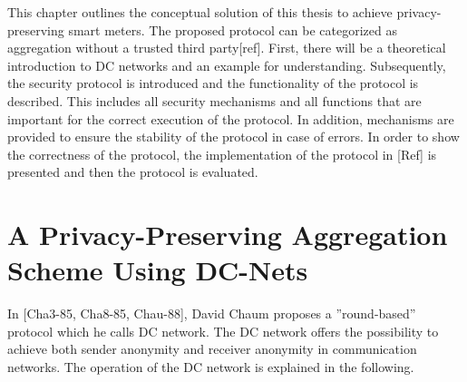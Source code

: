
This chapter outlines the conceptual solution of this thesis to achieve privacy-preserving smart meters. The proposed protocol can be categorized as aggregation without a trusted third party[ref]. First, there will be a theoretical introduction to DC networks and an example for understanding. Subsequently, the security protocol is introduced and the functionality of the protocol is described. This includes all security mechanisms and all functions that are important for the correct execution of the protocol. In addition, mechanisms are provided to ensure the stability of the protocol in case of errors. In order to show the correctness of the protocol, the implementation of the protocol in [Ref] is presented and then the protocol is evaluated.

\section{A Privacy-Preserving Aggregation Scheme Using DC-Nets}
In [Cha3-85, Cha8-85, Chau-88], David Chaum proposes a ''round-based'' protocol which he calls DC network. The DC network offers the possibility to achieve both sender anonymity and receiver anonymity in communication networks. The operation of the DC network is explained in the following.
